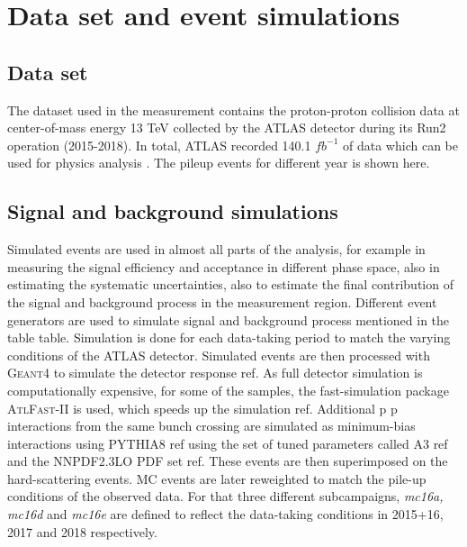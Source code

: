 
\section{Data set and event simulations}


\subsection{Data set}

The dataset used in the measurement contains the proton-proton collision data at center-of-mass energy 13 TeV collected by the ATLAS detector during its Run2 operation (2015-2018). In total, ATLAS recorded 140.1 $fb^{-1}$ of data which can be used for physics analysis \cite{Aad_2020}. The pileup events for different year is shown here.



\subsection{Signal and background simulations}
Simulated events are used in almost all parts of the analysis, for example in measuring the signal efficiency and acceptance in different phase space, also in estimating the systematic uncertainties, also to estimate the final contribution of the signal and background process in the measurement region. Different event generators are used to simulate signal and background process mentioned in the table {table}. Simulation is done for each data-taking period to match the varying conditions of the ATLAS detector.
Simulated events are then processed with \textsc{Geant4} to simulate the detector response {ref}. As full detector simulation is computationally expensive, for some of the samples, the fast-simulation package \textsc{AtlFast-II} is used, which speeds up the simulation {ref}. Additional p p interactions from the same bunch crossing are simulated as minimum-bias interactions using PYTHIA8 {ref} using the set of tuned parameters called A3 {ref} and the NNPDF2.3LO PDF set {ref}. These events are then superimposed on the hard-scattering events. MC events are later reweighted to match the pile-up conditions of the observed data. For that three different subcampaigns, \textit{mc16a, mc16d} and \textit{mc16e} are defined to reflect the data-taking conditions in 2015+16, 2017 and 2018 respectively.

